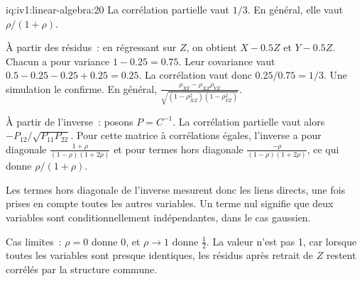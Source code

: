 \begin{solution}{iq:iv1:linear-algebra:20}
La corrélation partielle vaut $1/3$. En général, elle vaut $\rho/(1 + \rho)$.

À partir des résidus~: en régressant sur $Z$, on obtient $X - 0.5Z$ et $Y - 0.5Z$. Chacun a pour variance $1 - 0.25 = 0.75$. Leur covariance vaut $0.5 - 0.25 - 0.25 + 0.25 = 0.25$. La corrélation vaut donc $0.25/0.75 = 1/3$. Une simulation le confirme. En général, $\frac{\rho_{XY} - \rho_{XZ}\rho_{YZ}}{\sqrt{(1 - \rho_{XZ}^2)(1 - \rho_{YZ}^2)}}$.

À partir de l'inverse~: posons $P = C^{-1}$. La corrélation partielle vaut alors $-P_{12}/\sqrt{P_{11}P_{22}}$. Pour cette matrice à corrélations égales, l'inverse a pour diagonale $\frac{1 + \rho}{(1 - \rho)(1 + 2\rho)}$ et pour termes hors diagonale $\frac{-\rho}{(1 - \rho)(1 + 2\rho)}$, ce qui donne $\rho/(1 + \rho)$.

Les termes hors diagonale de l'inverse mesurent donc les liens directs, une fois prises en compte toutes les autres variables. Un terme nul signifie que deux variables sont conditionnellement indépendantes, dans le cas gaussien.

Cas limites~: $\rho = 0$ donne 0, et $\rho \to 1$ donne $\tfrac12$. La valeur n'est pas 1, car lorsque toutes les variables sont presque identiques, les résidus après retrait de $Z$ restent corrélés par la structure commune.

\end{solution}

